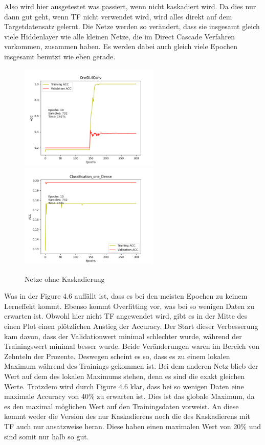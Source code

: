 Also wird hier ausgetestet was passiert, wenn nicht kaskadiert wird. Da dies nur dann gut geht, wenn TF nicht verwendet wird, wird alles direkt 
auf dem Targetdatensatz gelernt. Die Netze werden so verändert, dass sie insgesamt gleich viele Hiddenlayer wie alle kleinen Netze, die im 
Direct Cascade Verfahren vorkommen, zusammen haben. Es werden dabei auch gleich viele Epochen insgesamt benutzt wie eben gerade. 

\begin{figure}[htpb]
    \includegraphics[height=5cm]{../../Plots/ba_plots/classnocascade/1dc.png}
    \includegraphics[height=5cm]{../../Plots/ba_plots/classnocascade/cod.png}
    \caption{\label{fig:nocascade} Netze ohne Kaskadierung}
\end{figure}


Was in der Figure 4.6 auffällt ist, dass es bei den meisten Epochen zu keinem Lerneffekt kommt. Ebenso kommt Overfitting vor, was bei so wenigen 
Daten zu erwarten ist. Obwohl hier nicht TF angewendet wird, gibt es in der Mitte des einen Plot einen plötzlichen Anstieg der Accuracy. 
Der Start dieser Verbesserung kam davon, dass der Validationwert minimal schlechter wurde, während der Trainingswert minimal besser wurde. 
Beide Veränderungen waren im Bereich von Zehnteln der Prozente. 
Deswegen scheint es so, dass es zu einem lokalen Maximum während des Trainings gekommen ist. Bei dem anderen Netz blieb der Wert auf dem des 
lokalen Maximums stehen, denn es sind die exakt gleichen Werte. Trotzdem wird durch Figure 4.6 klar, dass bei so wenigen Daten eine maximale 
Accuracy von 40\% zu erwarten ist. Dies ist das globale Maximum, da es den maximal möglichen Wert auf den Trainingsdaten vorweist. 
An diese kommt weder die Version des nur Kaskadierens noch die des Kaskadierens mit TF auch nur 
ansatzweise heran. Diese haben einen maximalen Wert von 20\% und sind somit nur halb so gut. 

